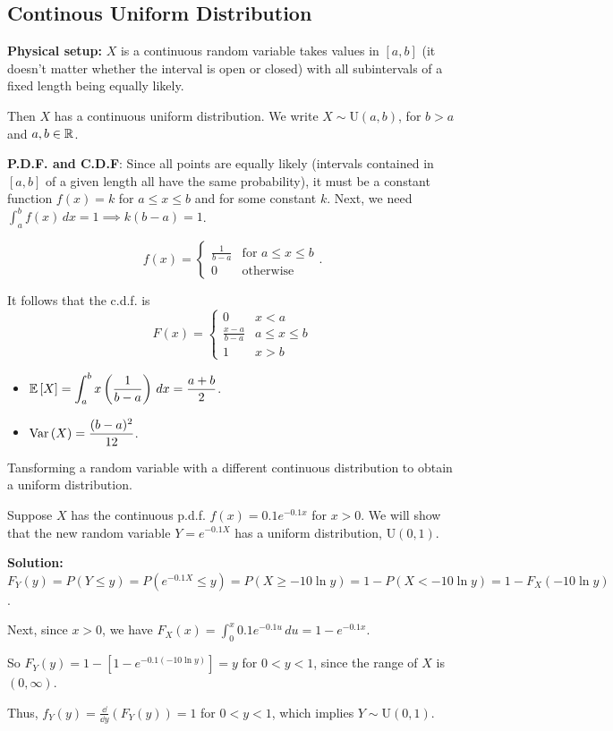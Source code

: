 \subsection{Continous Uniform Distribution}

\textbf{Physical setup:} $X$ is a continuous random variable takes values in $[a,b]$ (it doesn't matter whether the interval is open or closed) with all subintervals of a fixed length being equally likely.

Then $X$ has a continuous uniform distribution. We write $X \sim \text{U}(a,b)$, for $b > a$ and $a,b \in {\mathbb{R}}$.


\textbf{P.D.F. and C.D.F}:
Since all points are equally likely (intervals contained in $[a,b]$ of a given length all have the same probability), it must be a constant function $f(x) = k$ for $a \leq x \leq b$ and for some constant $k$.
Next, we need $\displaystyle \int_{a}^{b} f(x) \, dx = 1 \implies k(b-a) = 1$.

\[
    f(x) = 
    \begin{cases} 
    \frac{1}{b-a} & \text{for } a \leq x \leq b \\
    0 & \text{otherwise}
    \end{cases}.
\]

It follows that the c.d.f. is
\[
    F(x) = 
    \begin{cases} 
    0 & x < a \\
    \frac{x - a}{b - a} & a \leq x \leq b \\
    1 & x > b
    \end{cases}
\]

\begin{itemize}
    \item $\mathbb{E}\left[{X}\right] = \displaystyle \int_{a}^{b} x \left( \frac{1}{b-a} \right) \, dx = \frac{a+b}{2}$.
    \item $\operatorname{Var}\left({X}\right) = \displaystyle \frac{(b-a)^2}{12}$. \\
\end{itemize}

\begin{example}
    Tansforming a random variable with a different continuous distribution to obtain a uniform distribution.

    Suppose $X$ has the continuous p.d.f. $f(x) = 0.1 e^{-0.1x}$ for $x > 0$. We will show that the new random variable $Y = e^{-0.1X}$ has a uniform distribution, $\text{U}(0,1)$.

    \textbf{Solution:} \\
    $F_Y(y) = P(Y \leq y) = P(e^{-0.1X} \leq y) = P(X \geq -10\ln{y}) = 1 - P(X < -10 \ln{y}) = 1 - F_X(-10 \ln{y})$.

    Next, since $x > 0$, we have $F_X(x) = \displaystyle \int_{0}^{x} 0.1e^{-0.1u} \, du = 1 - e^{-0.1x}$. 
    
    So $F_Y(y) = 1 - \left[ 1 - e^{-0.1 \left( -10 \ln{y} \right)} \right] = y$ for $0 < y < 1$, since the range of $X$ is $(0,\infty)$.

    Thus, $f_Y(y) = \frac{\dd}{\dd{y}} (F_Y(y)) = 1$ for $0 < y < 1$, which implies $Y \sim \text{U}(0,1)$.
\end{example}


